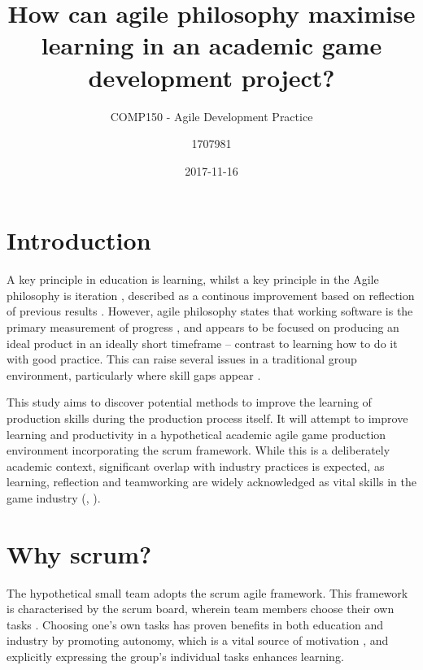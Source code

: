 \documentclass{scrartcl}
\title{How can agile philosophy maximise learning in an academic game development project?}
\subtitle{COMP150 - Agile Development Practice}
\date{2017-11-16}
\author{1707981}
\begin{document}
\maketitle
{}


\section{Introduction}
A key principle in education is learning, whilst a key principle in the Agile philosophy is iteration \cite{agile}, described as a continous improvement based on reflection of previous results \cite{iteration}. However, agile philosophy states that working software is the primary measurement of progress \cite{manifesto}, and appears to be focused on producing an ideal product in an ideally short timeframe -- contrast to learning how to do it with good practice. This can raise several issues in a traditional group environment, particularly where skill gaps appear \cite{group2003}.

This study aims to discover potential methods to improve the learning of production skills during the production process itself. It will attempt to improve learning and productivity in a hypothetical academic agile game production environment incorporating the scrum framework. While this is a deliberately academic context, significant overlap with industry practices is expected, as learning, reflection and teamworking are widely acknowledged as vital skills in the game industry (\cite{collaboration}, \cite{devstudy}).


\section{Why scrum?}
The hypothetical small team adopts the scrum agile framework. This framework is characterised by the scrum board, wherein team members choose their own tasks \cite{scrum}. Choosing one's own tasks has proven benefits in both education and industry by promoting autonomy, which is a vital source of motivation \cite{motivation}, and explicitly expressing the group's individual tasks enhances learning. \cite{group2005}
\end{document}
